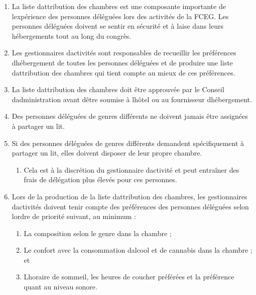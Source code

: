 \begin{enumerate}
 \item
  La liste d\textquotesingle attribution des chambres est une composante importante de l\textquotesingle expérience des personnes déléguées lors des activités de la FCEG. Les personnes déléguées doivent se sentir en sécurité et à l\textquotesingle aise dans leurs hébergements tout au long du congrès.
 \item
  Les gestionnaires d\textquotesingle activités sont responsables de recueillir les préférences d\textquotesingle hébergement de toutes les personnes déléguées et de produire une liste d\textquotesingle attribution des chambres qui tient compte au mieux de ces préférences.
 \item
  La liste d\textquotesingle attribution des chambres doit être approuvée par le Conseil d\textquotesingle administration avant d\textquotesingle être soumise à l\textquotesingle hôtel ou au fournisseur d\textquotesingle hébergement.
 \item
  Des personnes déléguées de genres différents ne doivent jamais être assignées à partager un lit.
 \item
  Si des personnes déléguées de genres différents demandent spécifiquement à partager un lit, elles doivent disposer de leur propre chambre.

  \begin{enumerate}
   \item
    Cela est à la discrétion du gestionnaire d\textquotesingle activité et peut entraîner des frais de délégation plus élevés pour ces personnes.
  \end{enumerate}
 \item
  Lors de la production de la liste d\textquotesingle attribution des chambres, les gestionnaires d\textquotesingle activités doivent tenir compte des préférences des personnes déléguées selon l\textquotesingle ordre de priorité suivant, au minimum :
  \begin{enumerate}
   \item
    La composition selon le genre dans la chambre ;
   \item
    Le confort avec la consommation d\textquotesingle alcool et de cannabis dans la chambre ; et
   \item
    L\textquotesingle horaire de sommeil, les heures de coucher préférées et la préférence quant au niveau sonore.
  \end{enumerate}
\end{enumerate}

